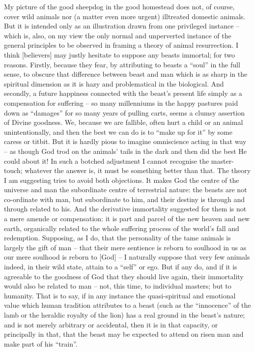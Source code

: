 \begin{footnotesize}
\begin{sffamily}
My picture of the good sheepdog in the good homestead does not, of course, cover wild animals nor (a matter even more urgent) illtreated domestic animals. But it is intended only as an illustration drawn from one privileged instance – which is, also, on my view the only normal and unperverted instance of the general principles to be observed in framing a theory of animal resurrection. I think [believers] may justly hesitate to suppose any beasts immortal; for two reasons. Firstly, because they fear, by attributing to beasts a “soul” in the full sense, to obscure that difference between beast and man which is as sharp in the spiritual dimension as it is hazy and problematical in the biological. And secondly, a future happiness connected with the beast's present life simply as a compensation for suffering – so many millenniums in the happy pastures paid down as “damages” for so many years of pulling carts, seems a clumsy assertion of Divine goodness. We, because we are fallible, often hurt a child or an animal unintentionally, and then the best we can do is to “make up for it” by some caress or titbit. But it is hardly pious to imagine omniscience acting in that way – as though God trod on the animals' tails in the dark and then did the best He could about it! In such a botched adjustment I cannot recognise the master-touch; whatever the answer is, it must be something better than that. The theory I am suggesting tries to avoid both objections. It makes God the centre of the universe and man the subordinate centre of terrestrial nature: the beasts are not co-ordinate with man, but subordinate to him, and their destiny is through and through related to his. And the derivative immortality suggested for them is not a mere amende or compensation: it is part and parcel of the new heaven and new earth, organically related to the whole suffering process of the world's fall and redemption. Supposing, as I do, that the personality of the tame animals is largely the gift of man – that their mere sentience is reborn to soulhood in us as our mere soulhood is reborn to [God] – I naturally suppose that very few animals indeed, in their wild state, attain to a “self” or ego. But if any do, and if it is agreeable to the goodness of God that they should live again, their immortality would also be related to man – not, this time, to individual masters; but to humanity. That is to say, if in any instance the quasi-spiritual and emotional value which human tradition attributes to a beast (such as the “innocence” of the lamb or the heraldic royalty of the lion) has a real ground in the beast's nature; and is not merely arbitrary or accidental, then it is in that capacity, or principally in that, that the beast may be expected to attend on risen man and make part of his “train”. 


\end{sffamily}
\end{footnotesize}
